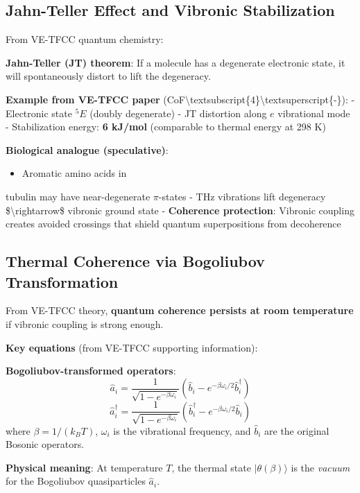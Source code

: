 \subsection{Jahn-Teller Effect and Vibronic
Stabilization}\label{jahn-teller-effect-and-vibronic-stabilization}

From VE-TFCC quantum chemistry:

\textbf{Jahn-Teller (JT) theorem}: If a molecule has a degenerate
electronic state, it will spontaneously distort to lift the degeneracy.

\textbf{Example from VE-TFCC paper}
(CoF\textbackslash textsubscript\{4\}\textbackslash textsuperscript\{-\}):
- Electronic state \(^5E\) (doubly degenerate) - JT distortion along
\(e\) vibrational mode - Stabilization energy: \textbf{6 kJ/mol}
(comparable to thermal energy at 298 K)

\textbf{Biological analogue (speculative)}:
\begin{itemize}
\item Aromatic amino acids in
\end{itemize}

tubulin may have near-degenerate \(\pi\)-states - THz vibrations lift
degeneracy \$\textbackslash rightarrow\$ vibronic ground state -
\textbf{Coherence protection}: Vibronic coupling creates avoided
crossings that shield quantum superpositions from decoherence

\subsection{Thermal Coherence via Bogoliubov
Transformation}\label{thermal-coherence-via-bogoliubov-transformation}

From VE-TFCC theory, \textbf{quantum coherence persists at room
temperature} if vibronic coupling is strong enough.

\textbf{Key equations} (from VE-TFCC supporting information):

\textbf{Bogoliubov-transformed operators}:
\[\hat{a}_i = \frac{1}{\sqrt{1 - e^{-\beta \omega_i}}} \left( \hat{b}_i - e^{-\beta \omega_i/2} \hat{b}_i^\dagger \right)\]
\[\hat{a}_i^\dagger = \frac{1}{\sqrt{1 - e^{-\beta \omega_i}}} \left( \hat{b}_i^\dagger - e^{-\beta \omega_i/2} \hat{b}_i \right)\]
where \(\beta = 1/(k_B T)\), \(\omega_i\) is the vibrational frequency,
and \(\hat{b}_i\) are the original Bosonic operators.

\textbf{Physical meaning}: At temperature \(T\), the thermal state
\(|\theta(\beta)\rangle\) is the \emph{vacuum} for the Bogoliubov
quasiparticles \(\hat{a}_i\).

